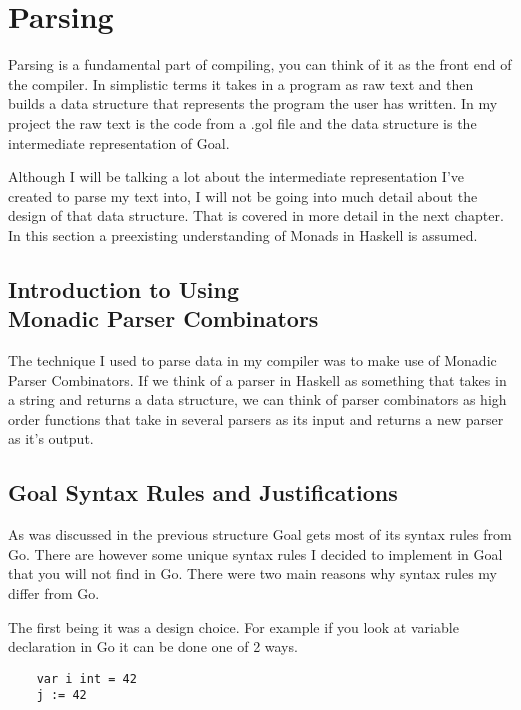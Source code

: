
\chapter{Parsing}

Parsing is a fundamental part of compiling, you can think of it as the front end of the compiler. In simplistic terms it takes in a program as raw text and then builds a data structure that represents the program the user has written. In my project the raw text is the code from a .gol file and the data structure is the intermediate representation of Goal. 

Although I will be talking a lot about the intermediate representation I've created to parse my text into, I will not be going into much detail about the design of that data structure. That is covered in more detail in the next chapter. In this section a preexisting understanding of Monads in Haskell is assumed.      

\section[Introduction to Using Monadic Parser Combinators]{Introduction to Using \\ Monadic Parser Combinators}

The technique I used to parse data in my compiler was to make use of Monadic Parser Combinators. If we think of a parser in Haskell as something that takes in a string and returns a data structure, we can think of parser combinators as high order functions that take in several parsers as its input and returns a new parser as it's output.  

\section{Goal Syntax Rules and Justifications}

As was discussed in the previous structure Goal gets most of its syntax rules from Go. There are however some unique syntax rules I decided to implement in Goal that you will not find in Go. There were two main reasons why syntax rules my differ from Go. 

The first being it was a design choice. For example if you look at variable declaration in Go it can be done one of 2 ways.

\begin{lstlisting}
	var i int = 42
	j := 42
\end{lstlisting}    

